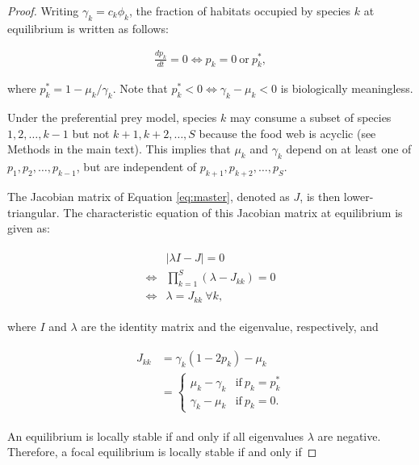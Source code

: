 \documentclass[11pt, class=article, crop=false]{standalone}
\theoremstyle{definition}
\begin{document}
\begin{proof}
Writing $\gamma_k = c_k \phi_k$,
the fraction of habitats occupied by species $k$ at equilibrium is written as follows:

\begin{align}
    \frac{dp_k}{dt} = 0 \Leftrightarrow p_k = 
         0 ~\text{or}~
         p_{k}^{*},
\end{align}

where $p_{k}^{*} = 1 - \mu_k / \gamma_k$.
Note that $p_{k}^{*} <0 \Leftrightarrow \gamma_k-\mu_k<0$ is biologically meaningless.

Under the preferential prey model, species $k$ may consume a subset of species $1,2,\ldots, k-1$ but not $k+1, k+2, \ldots, S$ because the food web is acyclic (see Methods in the main text).
This implies that $\mu_k$ and $\gamma_k$ depend on at least one of $p_1, p_2, \ldots, p_{k-1}$, but are independent of $p_{k+1}, p_{k+2}, \ldots, p_{S}$.

The Jacobian matrix of Equation \ref{eq:master}, denoted as $J$, is then lower-triangular.
The characteristic equation of this Jacobian matrix at equilibrium is given as:

\begin{align}
    \begin{split}
        &|\lambda I - J| = 0\\
        \Leftrightarrow 
        &\prod_{k=1}^{S}(\lambda -J_{kk})=0\\
        \Leftrightarrow
        &\lambda = J_{kk}~ \forall k,
    \end{split}
\end{align}

where $I$ and $\lambda$ are the identity matrix and the eigenvalue, respectively, and 

\begin{align}
    \begin{split}
        J_{kk}  &= \gamma_k(1-2p_k)-\mu_k \\
                &=\left\{
                       \begin{array}{cl}
                       \mu_k - \gamma_k& \text{if}~ p_k=p_k^*\\
                       \gamma_k - \mu_k& \text{if}~ p_k=0.
                       \end{array}
                   \right.
    \end{split}
\end{align}

An equilibrium is locally stable if and only if all eigenvalues $\lambda$ are negative. Therefore, a focal equilibrium is locally stable if and only if


\end{proof}
\end{document}
